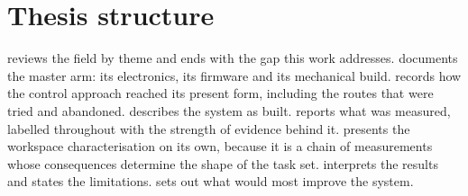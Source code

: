 \section{Thesis structure}

 reviews the field by theme and ends with the gap this
work addresses.  documents the master arm: its electronics,
its firmware and its mechanical build.  records how the
control approach reached its present form, including the routes that were
tried and abandoned.  describes the system as built.
 reports what was measured, labelled throughout with the
strength of evidence behind it.  presents the workspace
characterisation on its own, because it is a chain of measurements whose
consequences determine the shape of the task set. 
interprets the results and states the limitations. 
sets out what would most improve the system.
